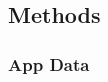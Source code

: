 \documentclass[man, floatsintext]{apa7}
\begin{document}
 






\subsection{Methods}

\subsubsection{App Data}
\end{document}
